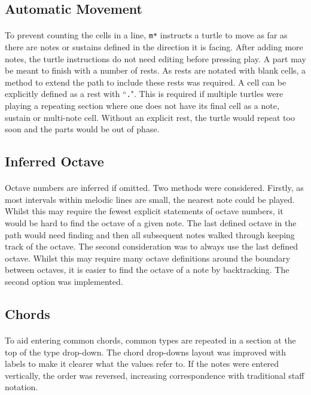 \subsection{Automatic Movement}

\paragraph{} To prevent counting the cells in a line, \texttt{m*} instructs a turtle to move as far as there are notes or sustains defined in the direction it is facing. After adding more notes, the turtle instructions do not need editing before pressing play. A part may be meant to finish with a number of rests. As rests are notated with blank cells, a method to extend the path to include these rests was required. A cell can be explicitly defined as a rest with ``\texttt{.}". This is required if multiple turtles were playing a repeating section where one does not have its final cell as a note, sustain or multi-note cell. Without an explicit rest, the turtle would repeat too soon and the parts would be out of phase.

\subsection{Inferred Octave}

\paragraph{} Octave numbers are inferred if omitted. Two methods were considered. Firstly, as most intervals within melodic lines are small, the nearest note could be played.
Whilst this may require the fewest explicit statements of octave numbers, it would be hard to find the octave of a given note. The last defined octave in the path would need finding and then all subsequent notes walked through keeping track of the octave. The second consideration was to always use the last defined octave. Whilst this may require many octave definitions around the boundary between octaves, it is easier to find the octave of a note by backtracking. The second option was implemented.

\subsection{Chords}

\paragraph{} To aid entering common chords, common types are repeated in a section at the top of the type drop-down. The chord drop-downs layout was improved with labels to make it clearer what the values refer to. If the notes were entered vertically, the order was reversed, increasing correspondence with traditional staff notation.

